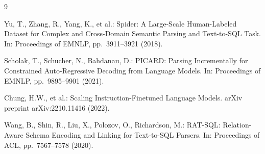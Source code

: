 \documentclass[11pt,a4paper]{article}
\begin{document}

\begin{thebibliography}{9}


Yu, T., Zhang, R., Yang, K., et al.:
Spider: A Large-Scale Human-Labeled Dataset for Complex and Cross-Domain
Semantic Parsing and Text-to-SQL Task.
In: Proceedings of EMNLP, pp.~3911--3921 (2018).

Scholak, T., Schucher, N., Bahdanau, D.:
PICARD: Parsing Incrementally for Constrained Auto-Regressive Decoding
from Language Models.
In: Proceedings of EMNLP, pp.~9895--9901 (2021).

Chung, H.W., et al.:
Scaling Instruction-Finetuned Language Models.
arXiv preprint arXiv:2210.11416 (2022).

Wang, B., Shin, R., Liu, X., Polozov, O., Richardson, M.:
RAT-SQL: Relation-Aware Schema Encoding and Linking for Text-to-SQL Parsers.
In: Proceedings of ACL, pp.~7567--7578 (2020).


\end{thebibliography}
\end{document}
